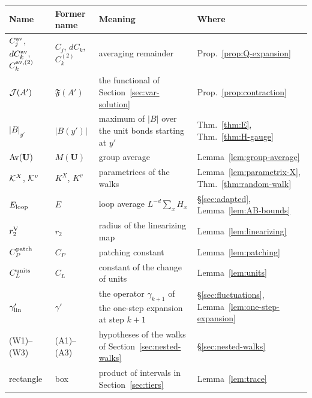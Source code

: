 \begin{center}\small
\renewcommand{\arraystretch}{1.12}
\begin{tabular}{|p{}|p{}|p{}|p{}|}
\hline
Name & Former name & Meaning & Where\tabularnewline
\hline
\raggedright $C^{\rm av}_j$, $dC^{\rm av}_k$, $C^{{\rm av},(2)}_k$ & $C_j$, $dC_k$, $C^{(2)}_k$ & \raggedright averaging remainder & \raggedright Prop.~\ref{prop:Q-expansion}\tabularnewline
\raggedright $\mathcal J(A')$ & $\mathfrak F(A')$ & \raggedright the functional of Section~\ref{sec:var-solution} & \raggedright Prop.~\ref{prop:contraction}\tabularnewline
\raggedright $|B|_{y'}$ & $|B(y')|$ & \raggedright maximum of $|B|$ over the unit bonds starting at $y'$ & \raggedright Thm.~\ref{thm:E}, Thm.~\ref{thm:H-gauge}\tabularnewline
\raggedright $\operatorname{Av}(\mathbf U)$ & $M(\mathbf U)$ & \raggedright group average & \raggedright Lemma~\ref{lem:group-average}\tabularnewline
\raggedright $\mathcal K^X$, $\mathcal K^v$ & $K^X$, $K^v$ & \raggedright parametrices of the walks & \raggedright Lemma~\ref{lem:parametrix-X}, Thm.~\ref{thm:random-walk}\tabularnewline
\raggedright $E_{\rm loop}$ & $E$ & \raggedright loop average $L^{-d}\sum_xH_x$ & \raggedright \S\ref{sec:adapted}, Lemma~\ref{lem:AB-bounds}\tabularnewline
\raggedright $r_2^{\rm V}$ & $r_2$ & \raggedright radius of the linearizing map & \raggedright Lemma~\ref{lem:linearizing}\tabularnewline
\raggedright $C^{\rm patch}_P$ & $C_P$ & \raggedright patching constant & \raggedright Lemma~\ref{lem:patching}\tabularnewline
\raggedright $C^{\rm units}_L$ & $C_L$ & \raggedright constant of the change of units & \raggedright Lemma~\ref{lem:units}\tabularnewline
\raggedright $\gamma'_{\rm lin}$ & $\gamma'$ & \raggedright the operator $\gamma_{k+1}$ of the one-step expansion at step $k+1$ & \raggedright \S\ref{sec:fluctuations}, Lemma~\ref{lem:one-step-expansion}\tabularnewline
\raggedright (W1)--(W3) & (A1)--(A3) & \raggedright hypotheses of the walks of Section~\ref{sec:nested-walks} & \raggedright \S\ref{sec:nested-walks}\tabularnewline
\raggedright rectangle & box & \raggedright product of intervals in Section~\ref{sec:tiers} & \raggedright Lemma~\ref{lem:trace}\tabularnewline
\hline
\end{tabular}
\end{center}

